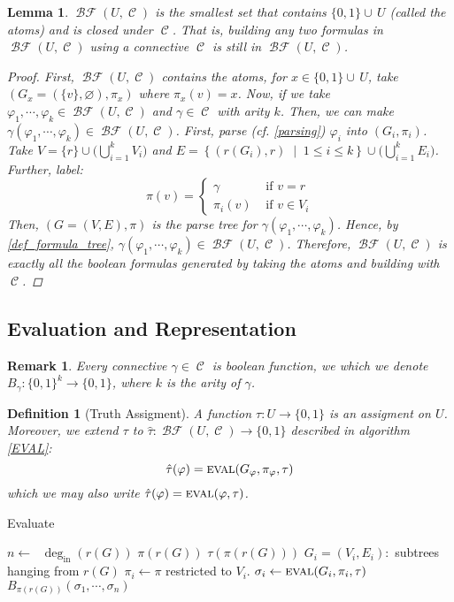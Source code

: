\documentclass[12pt]{article}
\let\emptyset\varnothing
\newcommand{\set}[2]{\left\{{#1}\;\middle|\;{#2}\right\}}
\newcommand{\scrf}[1]{{\scriptstyle\textup{\footnotesize #1}}}
\DeclareMathOperator{\C}{\mathcal{C}}
\DeclareMathOperator{\BF}{\mathcal{BF}}
\newcommand*{\B}{\{0,1\}}
\newcommand*{\degin}{\deg_{\text{in}}}
\newtheorem{definition}[theorem]{Definition}
\newtheorem{lemma}[theorem]{Lemma}
\newtheorem{remark}[theorem]{Remark}
\begin{document}
\begin{lemma}
  $\BF(U,\C)$ is the smallest set that contains $\B\cup\,U$ (called the atoms) and is closed under $\C$. That is, building any two formulas in $\BF(U,\C)$ using a connective $\C$ is still in $\BF(U,\C)$.
  \begin{proof}
    First, $\BF(U,\C)$ contains the atoms, for $x\in\B\cup\,U$, take $(G_x=(\{v\},\emptyset),\pi_x)$ where $\pi_x(v)=x$. Now, if we take $\varphi_1,\cdots,\varphi_k\in\BF(U,\C)$ and $\gamma\in\C$ with arity $k$. Then, we can make $\gamma(\varphi_1,\cdots,\varphi_k)\in\BF(U,\C)$. First, parse (cf. \ref{parsing}) $\varphi_i$ into $(G_i,\pi_i)$. Take $V=\{r\}\cup\big(\bigcup_{i=1}^k V_i\big)$ and $E=\set{(r(G_i),r)}{1\leq i\leq k}\cup\big(\bigcup_{i=1}^k E_i\big)$. Further, label: $$\pi(v)=\begin{cases}
      \gamma&\text{ if }v=r\\
      \pi_i(v)&\text{ if }v\in V_i
    \end{cases}$$ Then, $(G=(V,E),\pi)$ is the parse tree for $\gamma(\varphi_1,\cdots,\varphi_k)$. Hence, by \ref{def_formula_tree}, $\gamma(\varphi_1,\cdots,\varphi_k)\in\BF(U,\C)$. Therefore, $\BF(U,\C)$ is exactly all the boolean formulas generated by taking the atoms and building with $\C$.
  \end{proof}
\end{lemma}

\pagebreak

\subsection{Evaluation and Representation}

\begin{remark}
  \label{bool_connective}
  Every connective $\gamma\in\C$ is boolean function, we which we denote $B_\gamma:\B^k\to\B$, where $k$ is the arity of $\gamma$.
\end{remark}

\begin{definition}[Truth Assigment]
  A function $\tau:U\to\B$ is an assigment on $U$. Moreover, we extend $\tau$ to $\hat{\tau}:\BF(U,\C)\to\B$ described in algorithm \ref{EVAL}: $$\hat{\tau}(\varphi)=\scrf{EVAL}(G_\varphi,\pi_\varphi,\tau)$$ which we may also write $\hat{\tau}(\varphi)=\scrf{EVAL}(\varphi,\tau)$.
\end{definition}

\begin{algorithm}[H]
  \caption{Evaluate}
  \begin{algorithmic}
    \Function{$\scrf{EVAL}$}{$G=(V,E),\pi,\tau$}
      \State $n\gets\;$ $\degin(r(G))$
        \If{$\pi(r(G))\in\B$} \Return $\pi(r(G))$
        \Else{} \Return $\tau(\pi(r(G)))$
        \EndIf
      \Else
        \State $G_i=(V_i,E_i):$ subtrees hanging from $r(G)$
        \State $\pi_i\gets \pi$ restricted to $V_i$.
        \State $\sigma_i\gets \scrf{EVAL}(G_i,\pi_i,\tau)$
        \State \Return $B_{\pi(r(G))}(\sigma_1,\cdots,\sigma_n)$
      \EndIf
    \EndFunction
  \end{algorithmic}
  \label{EVAL}
\end{algorithm}
\end{document}
